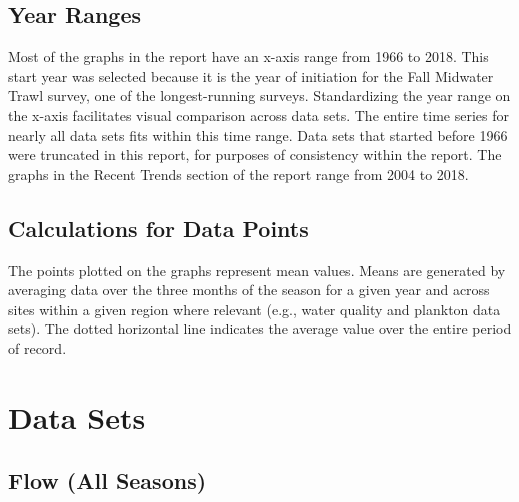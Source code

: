 \documentclass[
]{book}
\begin{document}
\hypertarget{year-ranges}{%
\subsection{Year Ranges}\label{year-ranges}}

Most of the graphs in the report have an x-axis range from 1966 to 2018. This start year was selected because it is the year of initiation for the Fall Midwater Trawl survey, one of the longest-running surveys. Standardizing the year range on the x-axis facilitates visual comparison across data sets. The entire time series for nearly all data sets fits within this time range. Data sets that started before 1966 were truncated in this report, for purposes of consistency within the report. The graphs in the Recent Trends section of the report range from 2004 to 2018.

\hypertarget{calculations-for-data-points}{%
\subsection{Calculations for Data Points}\label{calculations-for-data-points}}

The points plotted on the graphs represent mean values. Means are generated by averaging data over the three months of the season for a given year and across sites within a given region where relevant (e.g., water quality and plankton data sets). The dotted horizontal line indicates the average value over the entire period of record.

\hypertarget{data-sets}{%
\section{Data Sets}\label{data-sets}}

\hypertarget{flow-all-seasons}{%
\subsection{Flow (All Seasons)}\label{flow-all-seasons}}
\end{document}
